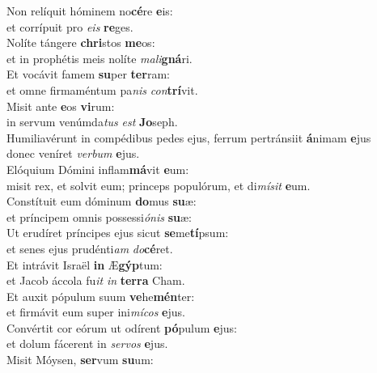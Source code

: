 \evenverse Non relíquit hóminem no\textbf{cé}re \textbf{e}is:~\*\\
\evenverse et corrípuit pro \textit{e}\textit{is} \textbf{re}ges.\\
\oddverse Nolíte tángere \textbf{chri}stos \textbf{me}os:~\*\\
\oddverse et in prophétis meis nolíte \textit{ma}\textit{li}\textbf{gná}ri.\\
\evenverse Et vocávit famem \textbf{su}per \textbf{ter}ram:~\*\\
\evenverse et omne firmaméntum pa\textit{nis} \textit{con}\textbf{trí}vit.\\
\oddverse Misit ante \textbf{e}os \textbf{vi}rum:~\*\\
\oddverse in servum venúmda\textit{tus} \textit{est} \textbf{Jo}seph.\\
\evenverse Humiliavérunt in compédibus pedes ejus, ferrum pertránsiit \textbf{á}nimam \textbf{e}jus~\*\\
\evenverse donec veníret \textit{ver}\textit{bum} \textbf{e}jus.\\
\oddverse Elóquium Dómini inflam\textbf{má}vit \textbf{e}um:~\*\\
\oddverse misit rex, et solvit eum; princeps populórum, et di\textit{mí}\textit{sit} \textbf{e}um.\\
\evenverse Constítuit eum dóminum \textbf{do}mus \textbf{su}æ:~\*\\
\evenverse et príncipem omnis possessi\textit{ó}\textit{nis} \textbf{su}æ:\\
\oddverse Ut erudíret príncipes ejus sicut \textbf{se}me\textbf{tí}psum:~\*\\
\oddverse et senes ejus prudénti\textit{am} \textit{do}\textbf{cé}ret.\\
\evenverse Et intrávit Israël \textbf{in} Æ\textbf{gýp}tum:~\*\\
\evenverse et Jacob áccola fu\textit{it} \textit{in} \textbf{ter}\textbf{ra} Cham.\\
\oddverse Et auxit pópulum suum \textbf{ve}he\textbf{mén}ter:~\*\\
\oddverse et firmávit eum super ini\textit{mí}\textit{cos} \textbf{e}jus.\\
\evenverse Convértit cor eórum ut odírent \textbf{pó}pulum \textbf{e}jus:~\*\\
\evenverse et dolum fácerent in \textit{ser}\textit{vos} \textbf{e}jus.\\
\oddverse Misit Móysen, \textbf{ser}vum \textbf{su}um:~\*\\
